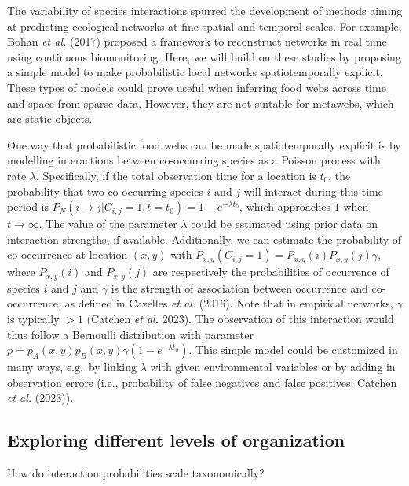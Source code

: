 \documentclass[10pt,oneside]{article}
\begin{document}
The variability of species interactions spurred the development of
methods aiming at predicting ecological networks at fine spatial and
temporal scales. For example, Bohan \emph{et al.} (2017) proposed a
framework to reconstruct networks in real time using continuous
biomonitoring. Here, we will build on these studies by proposing a
simple model to make probabilistic local networks spatiotemporally
explicit. These types of models could prove useful when inferring food
webs across time and space from sparse data. However, they are not
suitable for metawebs, which are static objects.

One way that probabilistic food webs can be made spatiotemporally
explicit is by modelling interactions between co-occurring species as a
Poisson process with rate \(\lambda\). Specifically, if the total
observation time for a location is \(t_0\), the probability that two
co-occurring species \(i\) and \(j\) will interact during this time
period is
\(P_N(i \rightarrow j | C_{i,j} = 1, t = t_0) = 1-e^{-\lambda t_0}\),
which approaches \(1\) when \(t \to \infty\). The value of the parameter
\(\lambda\) could be estimated using prior data on interaction
strengths, if available. Additionally, we can estimate the probability
of co-occurrence at location \((x,y)\) with
\(P_{x,y}(C_{i,j} = 1) = P_{x,y}(i) P_{x,y}(j)\gamma\), where
\(P_{x,y}(i)\) and \(P_{x,y}(j)\) are respectively the probabilities of
occurrence of species \(i\) and \(j\) and \(\gamma\) is the strength of
association between occurrence and co-occurrence, as defined in Cazelles
\emph{et al.} (2016). Note that in empirical networks, \(\gamma\) is
typically \(> 1\) (Catchen \emph{et al.} 2023). The observation of this
interaction would thus follow a Bernoulli distribution with parameter
\(p = p_A(x,y)p_B(x,y)\gamma(1-e^{-\lambda t_0})\). This simple model
could be customized in many ways, e.g.~by linking \(\lambda\) with given
environmental variables or by adding in observation errors (i.e.,
probability of false negatives and false positives; Catchen \emph{et
al.} (2023)).

\hypertarget{exploring-different-levels-of-organization}{%
\subsection{Exploring different levels of
organization}\label{exploring-different-levels-of-organization}}

How do interaction probabilities scale taxonomically?
\end{document}
